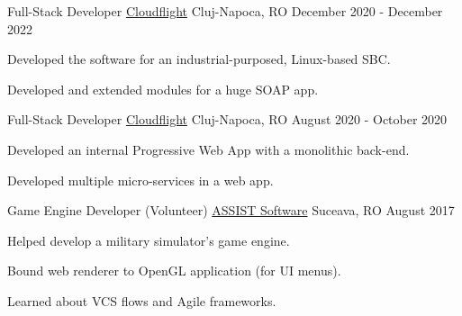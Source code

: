 

\begin{cventries}

  \cventry
  {Full-Stack Developer}
  {\href{https://cloudflight.io}{Cloudflight}}
  {Cluj-Napoca, RO}
  {December 2020 - December 2022}
  {
    \begin{cvitems}
      \item {Developed the software for an industrial-purposed, Linux-based SBC.}
      \item {Developed and extended modules for a huge SOAP app.}
    \end{cvitems}
  }

  \cventry
  {Full-Stack Developer}
  {\href{https://cloudflight.io}{Cloudflight}}
  {Cluj-Napoca, RO}
  {August 2020 - October 2020}
  {
    \begin{cvitems}
      \item {Developed an internal Progressive Web App with a monolithic back-end.}
      \item {Developed multiple micro-services in a web app.}
    \end{cvitems}
  }

  \cventry
  {Game Engine Developer (Volunteer)}
  {\href{https://assist-software.net/}{ASSIST Software}}
  {Suceava, RO}
  {August 2017}
  {
    \begin{cvitems}
      \item {Helped develop a military simulator's game engine.}
      \item {Bound web renderer to OpenGL application (for UI menus).}
      \item {Learned about VCS flows and Agile frameworks.}
    \end{cvitems}
  }

\end{cventries}